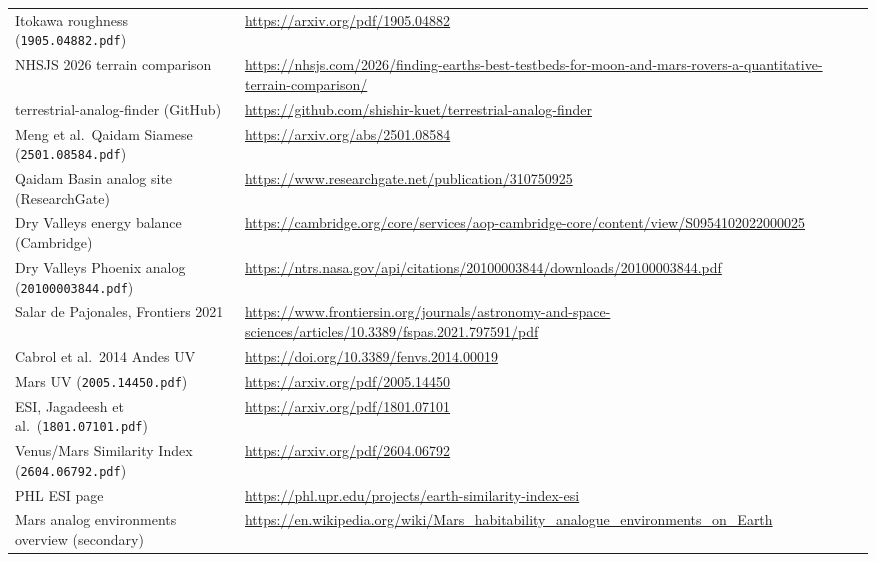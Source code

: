 \documentclass[11pt,a4paper]{article}
\begin{document}
{\begin{longtable}{@{}>{\raggedright\arraybackslash}p{}>{\raggedright\arraybackslash}p{}@{}}
Itokawa roughness (\texttt{1905.04882.pdf}) & \url{https://arxiv.org/pdf/1905.04882}\\
NHSJS 2026 terrain comparison & \url{https://nhsjs.com/2026/finding-earths-best-testbeds-for-moon-and-mars-rovers-a-quantitative-terrain-comparison/}\\
terrestrial-analog-finder (GitHub) & \url{https://github.com/shishir-kuet/terrestrial-analog-finder}\\
Meng et al.\ Qaidam Siamese (\texttt{2501.08584.pdf}) & \url{https://arxiv.org/abs/2501.08584}\\
Qaidam Basin analog site (ResearchGate) & \url{https://www.researchgate.net/publication/310750925}\\
Dry Valleys energy balance (Cambridge) & \url{https://cambridge.org/core/services/aop-cambridge-core/content/view/S0954102022000025}\\
Dry Valleys Phoenix analog (\texttt{20100003844.pdf}) & \url{https://ntrs.nasa.gov/api/citations/20100003844/downloads/20100003844.pdf}\\
Salar de Pajonales, Frontiers 2021 & \url{https://www.frontiersin.org/journals/astronomy-and-space-sciences/articles/10.3389/fspas.2021.797591/pdf}\\
Cabrol et al.\ 2014 Andes UV & \url{https://doi.org/10.3389/fenvs.2014.00019}\\
Mars UV (\texttt{2005.14450.pdf}) & \url{https://arxiv.org/pdf/2005.14450}\\
ESI, Jagadeesh et al.\ (\texttt{1801.07101.pdf}) & \url{https://arxiv.org/pdf/1801.07101}\\
Venus/Mars Similarity Index (\texttt{2604.06792.pdf}) & \url{https://arxiv.org/pdf/2604.06792}\\
PHL ESI page & \url{https://phl.upr.edu/projects/earth-similarity-index-esi}\\
Mars analog environments overview (secondary) & \url{https://en.wikipedia.org/wiki/Mars_habitability_analogue_environments_on_Earth}\\
\bottomrule
\end{longtable}}
\end{document}
